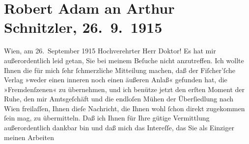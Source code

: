 

         
         \renewcommand{\erwaehntePersonen}{Personen: Robert Adam}
         \renewcommand{\erwaehnteInstitutionen}{Institutionen: Bezirksgericht Wien Floridsdorf, S. Fischer Verlag}
         \renewcommand{\erwaehnteOrte}{Orte: Meidlinger Hauptstraße, Wien, XII., Meidling, XXI., Floridsdorf, Zistersdorf}
         \renewcommand{\erwaehnteWerke}{Werke: Der Fremde}
               \section[Robert Adam an Arthur Schnitzler, 26. 9. 1915]{ Robert Adam an Arthur Schnitzler, 26. 9. 1915}\nopagebreak{}\rehead{ }\begin{ledgroupsized}[t]{13cm}\normalsize\beginnumbering \toendnotes[C]{\smallbreak\pagebreak[2]} 
\pstart
           \raggedleft{}{\pb}Wien, am 26. September 1915\pend
           \pstart{}Hochverehrter Herr Doktor!\pend\pstart
           Es hat mir außerordentlich leid getan, Sie bei meinem Beſuche nicht anzutreffen. Ich
               wollte Ihnen die für mich ſehr ſchmerzliche Mitteilung machen, daß der Fiſcher’ſche Verlag »weder einen inneren noch
               einen äußeren Anlaß« gefunden hat, die »Fremdenſzenen« zu übernehmen, und ich benütze jetzt den erſten Moment der
               Ruhe, den mir Amtsgeſchäft und die endloſen Mühen der Überſiedlung nach Wien freilaſſen, Ihnen dieſe Nachricht, die Ihnen
               wohl ſchon direkt zugekommen ſein mag, zu übermitteln.\pend
           \pstart
           Daß ich Ihnen für Ihre gütige Vermittlung außerordentlich dankbar bin und daß mich
               das {\pb}Intereſſe, das Sie als Einziger meinen Arbeiten

\end{ledgroupsized}
